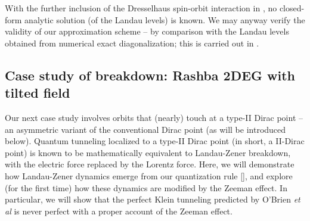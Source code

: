 \documentclass[aps, showpacs, twocolumn, notitlepage, superscriptaddress]{revtex4-1}
\begin{document}
With the further inclusion of the Dresselhaus spin-orbit interaction in , no closed-form analytic solution (of the Landau levels) is known. We may anyway verify the validity of our approximation scheme  -- by comparison with the Landau levels obtained from numerical exact diagonalization; this  is carried out in  .


\subsection{Case study of breakdown: Rashba 2DEG with tilted field}\label{sec:inplanezeeman}

Our next case study involves orbits that (nearly) touch at a type-II Dirac point\cite{soluyanov_type-ii_2015,muechler_tilted_2016} -- an asymmetric variant of the conventional Dirac point (as will be introduced below). Quantum tunneling localized to a type-II Dirac point  (in short, a II-Dirac point) is known to be mathematically equivalent to  Landau-Zener breakdown, with the electric force replaced by the Lorentz force\cite{AALG,obrien_magnetic_2016,kane_blount}. Here, we will demonstrate how Landau-Zener dynamics emerge from our quantization rule [], and explore (for the first time) how these dynamics are modified by the Zeeman effect. In particular, we will show that the perfect Klein tunneling predicted by O'Brien \textit{et al}\cite{obrien_magnetic_2016} is never perfect with a proper account of the Zeeman effect.
\end{document}
